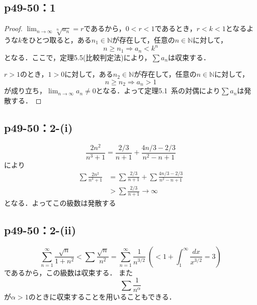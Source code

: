 \documentclass[a4paper,10pt,fleqn]{ltjsarticle}
\begin{document}
\newpage 


    \subsection*{p49-50：1}

\begin{tleftbar}
	\begin{proof}
		$\lim_{n \to \infty} \sqrt[n]{a_n} =r$であるから，$0<r<1$であるとき，$r<k<1$となるような$k$をひとつ取ると，ある$n_1 \in \mathbb{N}$が存在して，任意の$n \in \mathbb{N}$に対して，
		\[
			n \ge n_1 \Longrightarrow a_n<k^n
		\]
		となる．ここで，定理5.5(比較判定法)により，$\sum a_n$は収束する．

		$r>1$のとき，$1>0$に対して，ある$n_2 \in \mathbb{N}$が存在して，任意の$n \in \mathbb{N}$に対して，
		\[
			n \ge n_2 \Longrightarrow a_n >1
		\]
		が成り立ち，$\lim_{n \to \infty} a_n \ne 0$となる．よって定理5.1~系の対偶により$\sum a_n$は発散する．
	\end{proof}
\end{tleftbar}

\subsection*{p49-50：2-(i)}

\begin{screen}
	\[
	\frac{2n^2}{n^3+1}=\frac{2/3}{n+1}+\frac{4n/3-2/3}{n^2-n+1}
	\]
	により
	\begin{align*}
	\sum \frac{2n^2}{n^3+1}&=\sum \frac{2/3}{n+1}+\sum \frac{4n/3-2/3}{n^2-n+1} \\
	&>\sum \frac{2/3}{n+1} \rightarrow \infty
	\end{align*}
	となる．よってこの級数は発散する
	\end{screen}
	

    \subsection*{p49-50：2-(ii)}

	\begin{screen}
	\[
	\sum ^{\infty}_{n=1}\frac{\sqrt{n}}{1+n^2}<\sum \frac{\sqrt{n}}{n^2}=\sum^{\infty}_{n=1}\frac{1}{n^{3/2}}~\left(<1+\int^{\infty}_{1}\frac{dx}{x^{3/2}}=3\right)
	\]
    であるから，この級数は収束する．
	また
	\[
	\sum \frac{1}{n^\alpha}
	\]
	が$\alpha >1$のときに収束することを用いることもできる．
	\end{screen}
\end{document}
